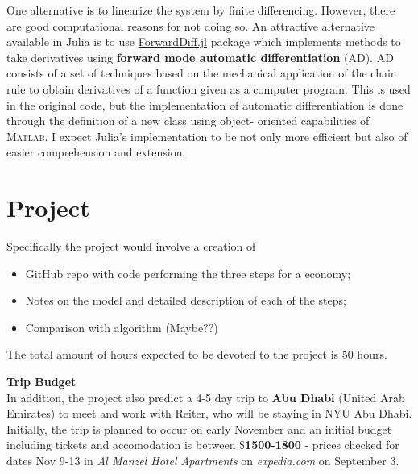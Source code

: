 \documentclass[paper=a4, fontsize=11pt, twosided]{article}  %
\numberwithin{equation}{section}        %
\numberwithin{figure}{section}          %
\numberwithin{table}{section}               %
\theoremstyle{plain}
\begin{document}
One alternative is to linearize the system by finite differencing. However, there are good computational reasons for not doing so. An
attractive alternative available in Julia is to use \href{https://github.com/JuliaDiff/ForwardDiff.jl}{ForwardDiff.jl} package which
implements methods to take derivatives using \textbf{forward mode automatic differentiation} (AD). AD consists of a set of techniques
based on the mechanical application of the chain rule to obtain derivatives of a function given as a computer program. This is used in
the original code, but the implementation of automatic differentiation is done through the definition of a new class using object-
oriented capabilities of \textsc{Matlab}. I expect Julia's implementation to be not only more efficient but also of easier
comprehension and extension.%


\section{Project} %
\label{sec:project}

Specifically the project would involve a creation of
\begin{itemize}

   \item GitHub repo with code performing the three steps for a \citet{krusellsmith} economy;

   \item Notes on the model and detailed description of each of the steps;

   \item Comparison with \citet{krusellsmith} algorithm (Maybe??)

\end{itemize}
The total amount of hours expected to be devoted to the project is 50 hours.

\textbf{Trip Budget } \\
In addition, the project also predict a 4-5 day trip to
\textbf{Abu Dhabi} (United Arab Emirates) to meet and work with Reiter, who will be staying in NYU Abu Dhabi.
%
Initially, the trip is planned to occur on early November and an initial budget including tickets and accomodation
is between \$\textbf{1500-1800} -
prices checked for dates Nov 9-13 in \emph{Al Manzel Hotel Apartments} on \emph{expedia.com} on September 3.
\end{document}
